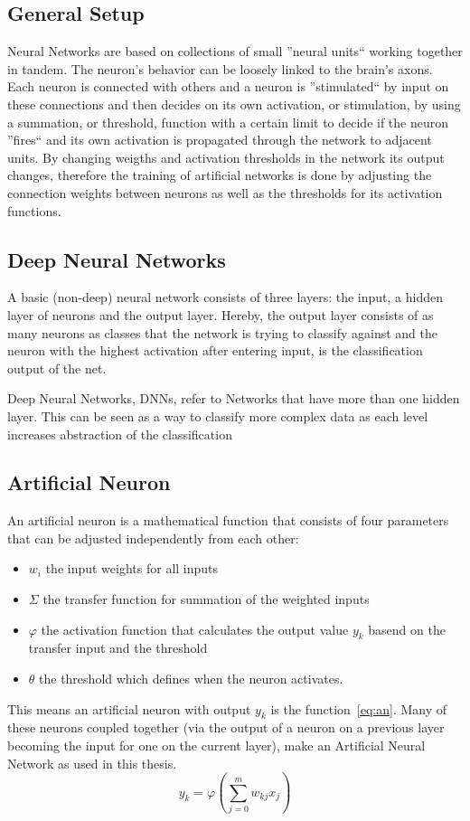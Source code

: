 \subsection{General Setup}
\label{sec:fund:general}
Neural Networks are based on collections of small ''neural units``  working together in tandem. The neuron's behavior can be loosely linked to the brain's axons. Each neuron is connected with others and a neuron is ''stimulated`` by input on these connections and then decides on its own activation, or stimulation, by using a summation, or threshold, function with a certain limit to decide if the neuron ''fires`` and its own activation is propagated through the network to adjacent units. By changing weigths and activation thresholds in the network its output changes, therefore the training of artificial networks is done by adjusting the connection weights between neurons as well as the thresholds for its activation functions. 

\subsection{Deep Neural Networks}
\label{sec:fund:DNN}

A basic (non-deep) neural network consists of three layers: the input, a hidden layer of neurons and the output layer. Hereby, the output layer consists of as many neurons as classes that the network is trying to classify against and the neuron with the highest activation after entering input, is the classification output of the net.

Deep Neural Networks, DNNs, refer to Networks that have more than one hidden layer. This can be seen as a way to classify more complex data as each level increases abstraction of the classification

\subsection{Artificial Neuron}
\label{sec:fund:AN}

An artificial neuron is a mathematical function that consists of four parameters that can be adjusted independently from each other:
\begin{itemize}
\item \(w_i\) the input weights for all inputs
\item \(\Sigma\) the transfer function for summation of the weighted inputs
\item \(\varphi\) the activation function that calculates the output value \(y_k\) basend on the transfer input and the threshold
\item \(\theta\) the threshold which defines when the neuron activates.
\end{itemize}
This means an artificial neuron with output \(y_k\) is the function~\ref{eq:an}. Many of these neurons coupled together (via the output of a neuron on a previous layer becoming the input for one on the current layer), make an Artificial Neural Network as used in this thesis.
\begin{equation}
y_k = \varphi(\sum_{j=0}^{m} w_{kj}x_j)
\label{eq:an}
\end{equation}

